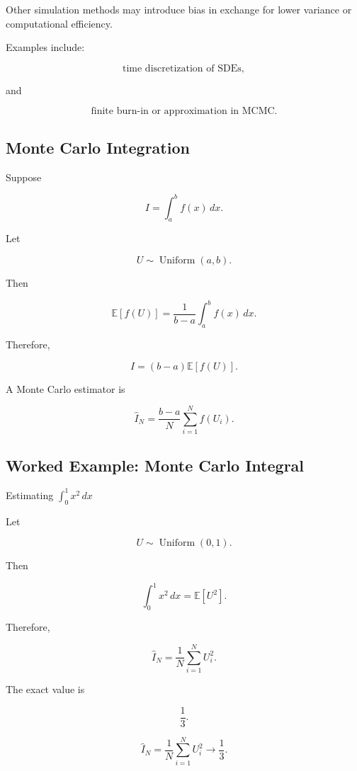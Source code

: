 Other simulation methods may introduce bias in exchange for lower variance
or computational efficiency.

Examples include:

\[
\boxed{
\text{time discretization of SDEs},
}
\]

and

\[
\boxed{
\text{finite burn-in or approximation in MCMC}.
}
\]

\subsection{Monte Carlo Integration}
\label{subsec:monte-carlo-integration}

Suppose

\[
I
=
\int_a^b
f(x)\,dx.
\]

Let

\[
U
\sim
\operatorname{Uniform}(a,b).
\]

Then

\[
\mathbb{E}[f(U)]
=
\frac1{b-a}
\int_a^b
f(x)\,dx.
\]

Therefore,

\[
\boxed{
I
=
(b-a)
\mathbb{E}[f(U)].
}
\]

A Monte Carlo estimator is

\[
\boxed{
\widehat{I}_N
=
\frac{
b-a
}{
N
}
\sum_{i=1}^{N}
f(U_i).
}
\]

\subsection{Worked Example: Monte Carlo Integral}
\label{subsec:worked-mc-integral}

\begin{workedexamplebox}{Estimating \(\int_0^1 x^2\,dx\)}

Let

\[
U\sim\operatorname{Uniform}(0,1).
\]

Then

\[
\int_0^1x^2\,dx
=
\mathbb{E}[U^2].
\]

Therefore,

\[
\widehat{I}_N
=
\frac1N
\sum_{i=1}^{N}
U_i^2.
\]

The exact value is

\[
\frac13.
\]

\begin{answerbox}
\[
\boxed{
\widehat{I}_N
=
\frac1N
\sum_{i=1}^{N}
U_i^2
\to
\frac13.
}
\]
\end{answerbox}

\end{workedexamplebox}


